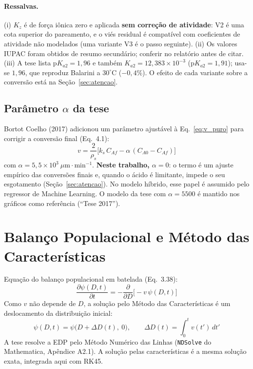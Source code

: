 \documentclass[12pt,a4paper]{article}
\begin{document}
\paragraph{Ressalvas.} (i) $K_z$ é de força iônica zero e aplicada \textbf{sem correção de atividade}: V2 é uma cota superior do pareamento, e o viés residual é compatível com coeficientes de atividade não modelados (uma variante V3 é o passo seguinte). (ii) Os valores IUPAC foram obtidos de resumo secundário; conferir no relatório antes de citar. (iii) A tese lista $\text{p}K_{a2} = 1{,}96$ e também $K_{a2} = 12{,}383 \times 10^{-3}$ ($\text{p}K_{a2} = 1{,}91$); usa-se $1{,}96$, que reproduz Balarini a $30^\circ\text{C}$ ($-0{,}4\%$). O efeito de cada variante sobre a conversão está na Seção~\ref{sec:atencao}.

\subsection{Parâmetro $\alpha$ da tese}
Bortot Coelho (2017) adicionou um parâmetro ajustável à Eq.~\eqref{eq:v_puro} para corrigir a conversão final (Eq.~4.1):
\begin{equation}
    v = \frac{2}{\rho_s} \Big[ k_s \, C_{Af} - \alpha \, (C_{A0} - C_{Af}) \Big]
\end{equation}
com $\alpha = 5{,}5 \times 10^3\ \mu\text{m}\cdot\text{min}^{-1}$. \textbf{Neste trabalho, $\alpha = 0$}: o termo é um ajuste empírico das conversões finais e, quando o ácido é limitante, impede o seu esgotamento (Seção~\ref{sec:atencao}). No modelo híbrido, esse papel é assumido pelo regressor de Machine Learning. O modelo da tese com $\alpha = 5500$ é mantido nos gráficos como referência (``Tese 2017'').

\section{Balanço Populacional e Método das Características}

Equação do balanço populacional em batelada (Eq.~3.38):
\begin{equation}
    \frac{\partial \psi(D,t)}{\partial t} = -\frac{\partial}{\partial D} \big[ -v \, \psi(D,t) \big]
\end{equation}
Como $v$ não depende de $D$, a solução pelo Método das Características é um deslocamento da distribuição inicial:
\begin{equation}
    \psi(D,t) = \psi\big(D + \Delta D(t),\ 0\big), \qquad \Delta D(t) = \int_0^t v(t') \, dt'
\end{equation}
A tese resolve a EDP pelo Método Numérico das Linhas (\texttt{NDSolve} do Mathematica, Apêndice A2.1). A solução pelas características é a mesma solução exata, integrada aqui com RK45.
\end{document}
